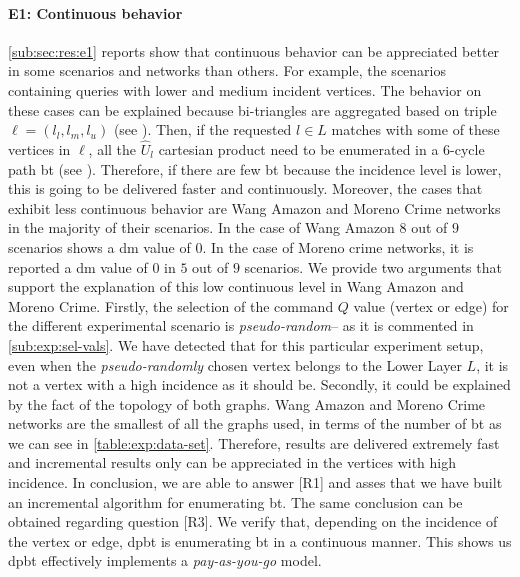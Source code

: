 \paragraph{E1: Continuous behavior} \autoref{sub:sec:res:e1} reports show that continuous behavior can be appreciated better in some scenarios and networks than others. For example, the scenarios containing queries with lower and medium incident vertices. 
The behavior on these cases can be explained because bi-triangles are aggregated based on triple $\ell = (l_l,l_m,l_u)$ (see ). Then, if the requested $l \in L$ matches with some of these vertices in $\ell$, all the $\hat{U}_l$ cartesian product need to be enumerated in a 6-cycle path \acrshort{bt} (see ). 
Therefore, if there are few \acrshort{bt} because the incidence level is lower, this is going to be delivered faster and continuously.
Moreover, the cases that exhibit less continuous behavior are Wang Amazon and Moreno Crime networks in the majority of their scenarios. In the case of Wang Amazon $8$ out of $9$ scenarios shows a \acrshort{dm} value of $0$. In the case of Moreno crime networks, it is reported a \acrshort{dm} value of $0$ in $5$ out of $9$ scenarios. 
We provide two arguments that support the explanation of this low continuous level in Wang Amazon and Moreno Crime. 
Firstly, the selection of the command $Q$ value (vertex or edge) for the different experimental scenario is \emph{pseudo-random}-- as it is commented in \autoref{sub:exp:sel-vals}. 
We have detected that for this particular experiment setup, even when the \emph{pseudo-randomly} chosen vertex belongs to the Lower Layer $L$, it is not a vertex with a high incidence as it should be.
Secondly, it could be explained by the fact of the topology of both graphs. Wang Amazon and Moreno Crime networks are the smallest of all the graphs used, in terms of the number of \acrshort{bt} as we can see in \autoref{table:exp:data-set}.
Therefore, results are delivered extremely fast and incremental results only can be appreciated in the vertices with high incidence.
In conclusion, we are able to answer [R1] and asses that we have built an incremental algorithm for enumerating \acrlong{bt}. 
The same conclusion can be obtained regarding question [R3]. We verify that, depending on the incidence of the vertex or edge, \acrshort{dpbt} is enumerating \acrshort{bt} in a continuous manner. This shows us \acrshort{dpbt} effectively implements a \emph{pay-as-you-go} model.

